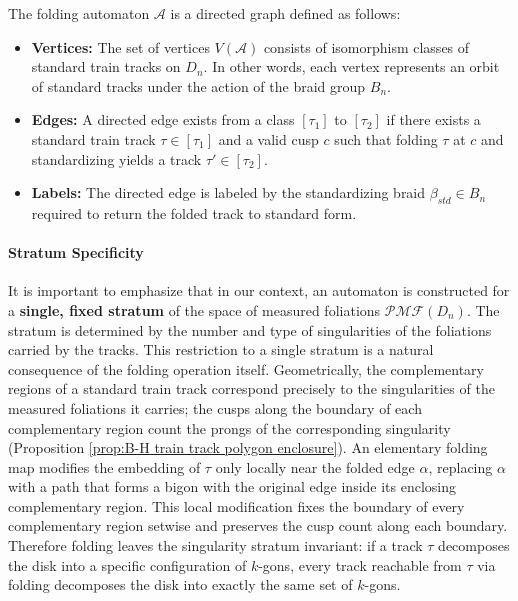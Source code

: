 \begin{definition}
    The folding automaton $\mathcal{A}$ is a directed graph defined as follows:
    \begin{itemize}
        \item \textbf{Vertices:} The set of vertices $V(\mathcal{A})$ consists of isomorphism classes of standard train tracks on $D_n$. In other words, each vertex represents an orbit of standard tracks under the action of the braid group $B_n$.
        \item \textbf{Edges:} A directed edge exists from a class $[\tau_1]$ to $[\tau_2]$ if there exists a standard train track $\tau \in [\tau_1]$ and a valid cusp $c$ such that folding $\tau$ at $c$ and standardizing yields a track $\tau' \in [\tau_2]$.
        \item \textbf{Labels:} The directed edge is labeled by the standardizing braid $\beta_{std} \in B_n$ required to return the folded track to standard form.
    \end{itemize}
\end{definition}

\paragraph{Stratum Specificity}
It is important to emphasize that in our context, an automaton is constructed for a \textbf{single, fixed stratum} of the space of measured foliations $\mathcal{PMF}(D_n)$. The stratum is determined by the number and type of singularities of the foliations carried by the tracks. This restriction to a single stratum is a natural consequence of the folding operation itself. Geometrically, the complementary regions of a standard train track correspond precisely to the singularities of the measured foliations it carries; the cusps along the boundary of each complementary region count the prongs of the corresponding singularity (Proposition \ref{prop:B-H train track polygon enclosure}). An elementary folding map modifies the embedding of $\tau$ only locally near the folded edge $\alpha$, replacing $\alpha$ with a path that forms a bigon with the original edge inside its enclosing complementary region. This local modification fixes the boundary of every complementary region setwise and preserves the cusp count along each boundary. Therefore folding leaves the singularity stratum invariant: if a track $\tau$ decomposes the disk into a specific configuration of $k$-gons, every track reachable from $\tau$ via folding decomposes the disk into exactly the same set of $k$-gons.

